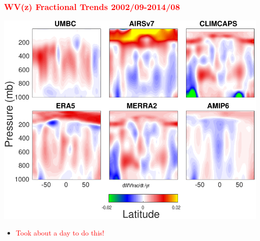 \documentclass[10pt,t]{beamer}
\begin{document}
\begin{frame}
\frametitle{\textcolor{red}{WV(z) Fractional Trends 2002/09-2014/08}}  
\vspace{-0.15in}
\begin{center}
\includegraphics[width=0.8\linewidth]{Figs2002_2014/wvfrac_trends_2002_2014.pdf}
\end{center}

\small
\begin{itemize}
\item \textcolor{red}{Took about a day to do this!}
\end{itemize}

\end{frame}

\end{document}
